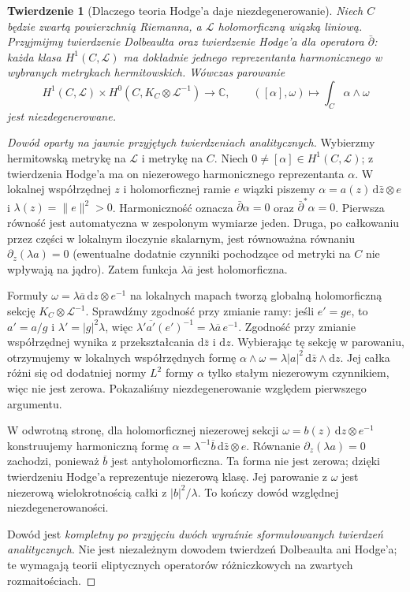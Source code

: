 \documentclass[11pt,a4paper,openany]{report}
\numberwithin{equation}{section}
\theoremstyle{plain}
\newtheorem{twierdzenie}{Twierdzenie}[section]
\theoremstyle{definition}
\theoremstyle{remark}
\newcommand{\C}{\mathbb C}
\begin{document}
\begin{twierdzenie}[Dlaczego teoria Hodge'a daje niezdegenerowanie]
\label{tw:serre-hodge-dependent}
Niech $C$ będzie zwartą powierzchnią Riemanna,
a $\mathcal L$ holomorficzną wiązką liniową.
Przyjmijmy \emph{twierdzenie Dolbeaulta} oraz
\emph{twierdzenie Hodge'a dla operatora $\bar\partial$}:
każda klasa $H^1(C,\mathcal L)$ ma dokładnie jednego
reprezentanta harmonicznego w wybranych metrykach
hermitowskich. Wówczas parowanie
\[
H^1(C,\mathcal L)\times
H^0(C,K_C\otimes\mathcal L^{-1})\longrightarrow\C,
\qquad([\alpha],\omega)\longmapsto
\int_C\alpha\wedge\omega
\]
jest niezdegenerowane.
\end{twierdzenie}
\begin{proof}[Dowód oparty na jawnie przyjętych twierdzeniach analitycznych]
Wybierzmy hermitowską metrykę na $\mathcal L$ i metrykę
na $C$. Niech $0\ne[\alpha]\in H^1(C,\mathcal L)$;
z twierdzenia Hodge'a ma on niezerowego harmonicznego
reprezentanta $\alpha$. W lokalnej współrzędnej $z$
i holomorficznej ramie $e$ wiązki piszemy
$\alpha=a(z)\,\mathrm d\bar z\otimes e$ i
$\lambda(z)=\lVert e\rVert^2>0$.
Harmoniczność oznacza $\bar\partial\alpha=0$ oraz
$\bar\partial^*\alpha=0$. Pierwsza równość jest
automatyczna w zespolonym wymiarze jeden.
Druga, po całkowaniu przez części w lokalnym iloczynie
skalarnym, jest równoważna równaniu
$\partial_z(\lambda a)=0$ (ewentualne dodatnie czynniki
pochodzące od metryki na $C$ nie wpływają na jądro).
Zatem funkcja $\lambda\overline a$ jest holomorficzna.

Formuły $\omega=\lambda\overline a\,\mathrm dz\otimes e^{-1}$
na lokalnych mapach tworzą globalną holomorficzną
sekcję $K_C\otimes\mathcal L^{-1}$. Sprawdźmy zgodność
przy zmianie ramy: jeśli $e'=g e$, to
$a'=a/g$ i $\lambda'=|g|^2\lambda$,
więc $\lambda'\overline{a'}(e')^{-1}
=\lambda\overline a\,e^{-1}$. Zgodność przy zmianie
współrzędnej wynika z przekształcania
$\mathrm d\bar z$ i $\mathrm dz$.
Wybierając tę sekcję w parowaniu, otrzymujemy
w lokalnych współrzędnych formę
$\alpha\wedge\omega=
\lambda|a|^2\,\mathrm d\bar z\wedge\mathrm dz$.
Jej całka różni się od dodatniej normy $L^2$ formy
$\alpha$ tylko stałym niezerowym czynnikiem,
więc nie jest zerowa. Pokazaliśmy niezdegenerowanie
względem pierwszego argumentu.

W odwrotną stronę, dla holomorficznej niezerowej
sekcji $\omega=b(z)\,\mathrm dz\otimes e^{-1}$
konstruujemy harmoniczną formę
$\alpha=\lambda^{-1}\overline b\,\mathrm d\bar z\otimes e$.
Równanie $\partial_z(\lambda a)=0$ zachodzi, ponieważ
$\overline b$ jest antyholomorficzna. Ta forma nie
jest zerowa; dzięki twierdzeniu Hodge'a reprezentuje
niezerową klasę. Jej parowanie z $\omega$ jest
niezerową wielokrotnością całki z $|b|^2/\lambda$.
To kończy dowód względnej niezdegenerowaności.

Dowód jest \emph{kompletny po przyjęciu dwóch
wyraźnie sformułowanych twierdzeń analitycznych}.
Nie jest niezależnym dowodem twierdzeń Dolbeaulta
ani Hodge'a; te wymagają teorii eliptycznych
operatorów różniczkowych na zwartych rozmaitościach.
\end{proof}
\end{document}

